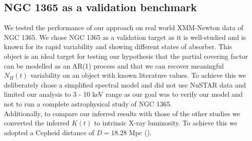 \documentclass{aa}
\begin{document}
\subsection{NGC 1365 as a validation benchmark}
\label{sec:discuss_ngc1365}
We tested the performance of our approach on real world XMM-Newton data of NGC 1365. We chose NGC 1365 as a validation target as it is well-studied and is known for its rapid variability and showing different states of absorber. This object is an ideal target for testing our hypothesis that the partial covering factor can be modelled as an AR(1) process and that we can recover meaningful $N_H(t)$ variability on an object with known literature values. To achieve this we deliberately chose a simplified spectral model and did not use NuSTAR data and limited our analysis to 3 - 10 keV range as our goal was to verify our model and not to run a complete astrophysical study of NGC 1365. \\
Additionally, to compare our inferred results with those of the other studies we converted the inferred $K(t)$ to intrinsic X-ray luminosity. To achieve this we adopted a Cepheid distance of $D = 18.28$ Mpc (\citealt{Silbermann1999}). \\
\end{document}
